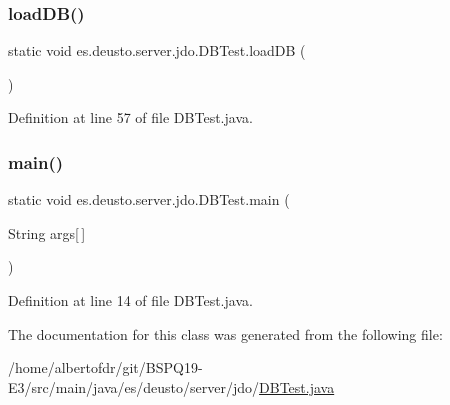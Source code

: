 \mbox{\label{classes_1_1deusto_1_1server_1_1jdo_1_1_d_b_test_a8430b487bdfdf20d5f0e26517b7de1cc}} 
\subsubsection{\texorpdfstring{load\+D\+B()}{loadDB()}}
{\footnotesize\ttfamily static void es.\+deusto.\+server.\+jdo.\+D\+B\+Test.\+load\+DB (\begin{DoxyParamCaption}{ }\end{DoxyParamCaption})\hspace{0.3cm}{\ttfamily [static]}}



Definition at line 57 of file D\+B\+Test.\+java.

\mbox{\label{classes_1_1deusto_1_1server_1_1jdo_1_1_d_b_test_afd0180d9045ac006d8cbd145b9935c65}} 
\subsubsection{\texorpdfstring{main()}{main()}}
{\footnotesize\ttfamily static void es.\+deusto.\+server.\+jdo.\+D\+B\+Test.\+main (\begin{DoxyParamCaption}\item[{String}]{args\mbox{[}$\,$\mbox{]} }\end{DoxyParamCaption})\hspace{0.3cm}{\ttfamily [static]}}



Definition at line 14 of file D\+B\+Test.\+java.



The documentation for this class was generated from the following file\+:\begin{DoxyCompactItemize}
\item 
/home/albertofdr/git/\+B\+S\+P\+Q19-\/\+E3/src/main/java/es/deusto/server/jdo/\hyperlink{_d_b_test_8java}{D\+B\+Test.\+java}\end{DoxyCompactItemize}
